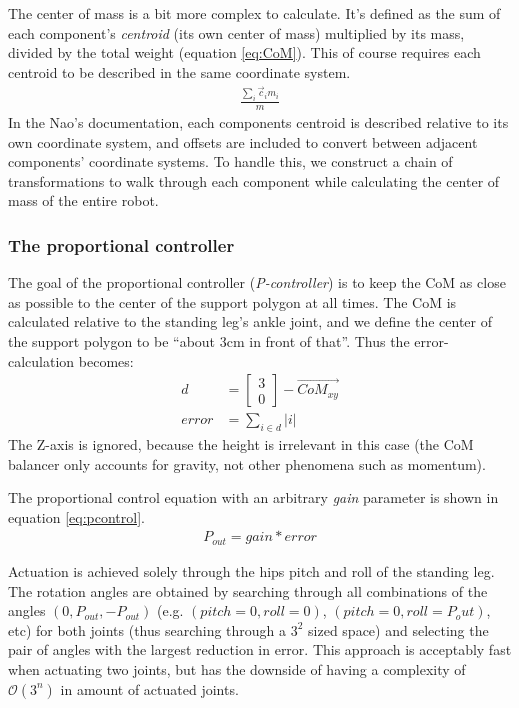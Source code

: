 \documentclass[a4paper]{article}
\begin{document}
The center of mass is a bit more complex to calculate. It's defined as the sum
of each component’s \emph{centroid} (its own center of mass) multiplied by its
mass, divided by the total weight (equation \ref{eq:CoM}). This of course
requires each centroid to be described in the same coordinate system.
\begin{align}
  \frac{\sum_i \vec{c}_i m_i} {m}        \label{eq:CoM}
\end{align}
In the Nao’s documentation, each components centroid is described relative to
its own coordinate system, and offsets are included to convert between adjacent
components’ coordinate systems. To handle this, we construct a chain of
transformations to walk through each component while calculating the center of
mass of the entire robot.

\subsubsection{The proportional controller}
The goal of the proportional controller (\emph{P-controller}) is to keep the
CoM as close as possible to the center of the support polygon at all times.
The CoM is calculated relative to the standing leg's ankle joint, and we define
the center of the support polygon to be ``about 3cm in front of that''. Thus the
error-calculation becomes:
\begin{align}
  d &= \begin{bmatrix} 3 \\ 0 \end{bmatrix} - \vec{CoM_{xy}} \\
  error &= \sum_{i \in d} |i|
\end{align}
The Z-axis is ignored, because the height is irrelevant in this case (the CoM
balancer only accounts for gravity, not other phenomena such as momentum).

The proportional control equation with an arbitrary \emph{gain} parameter is
shown in equation \ref{eq:pcontrol}.
\begin{align}
  P_{out} = gain * error        \label{eq:pcontrol}
\end{align}

Actuation is achieved solely through the hips pitch and roll of the standing leg.
The rotation angles are obtained by searching through all combinations of the angles
$(0, P_{out}, -P_{out})$ (e.g. $(pitch = 0, roll = 0)$, $(pitch = 0, roll = P_out)$, etc)
for both joints (thus searching through a $3^2$ sized space) and selecting the pair
of angles with the largest reduction in error. This approach is acceptably fast
when actuating two joints, but has the downside of having a complexity of $\mathcal{O}(3^n)$
in amount of actuated joints.
\end{document}
